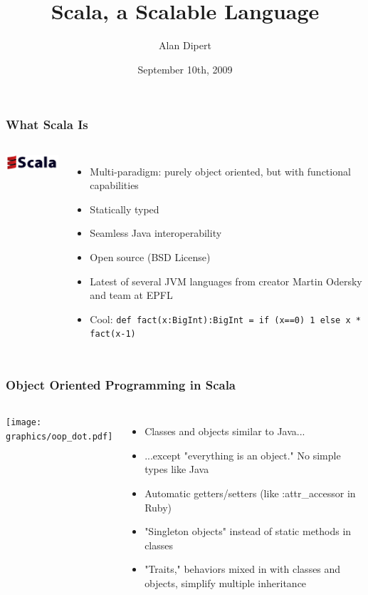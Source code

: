 \documentclass[hyperref={colorlinks=true}]{beamer}
\title{Scala, a Scalable Language}
\author{Alan Dipert}
\date{September 10th, 2009}
\begin{document}
 
\maketitle 

\begin{frame} 
\frametitle{What Scala Is}
\begin{columns}[c]
  \column{0.5in}
    \includegraphics[width=1.0in]{graphics/scala_logo.png} 
  \column{2.5in}
    \begin{itemize}
      \item<1-> Multi-paradigm: purely object oriented, but with functional capabilities
      \item<2-> Statically typed
      \item<3-> Seamless Java interoperability
      \item<4-> Open source (BSD License)
      \item<5-> Latest of several JVM languages from creator Martin Odersky and team at EPFL
      \item<6-> Cool: \tt\small{def fact(x:BigInt):BigInt = if (x==0) 1 else x * fact(x-1)}
    \end{itemize}
\end{columns}
\end{frame} 

\begin{frame} 
\frametitle{Object Oriented Programming in Scala}
\begin{columns}[c]
  \column{1.0in}
    \texttt{[image: graphics/oop\_dot.pdf]} 
  \column{2.0in}
    \begin{itemize}
      \item<1-> Classes and objects similar to Java...
      \item<2-> ...except "everything is an object."  No simple types like Java
      \item<3-> Automatic getters/setters (like :attr\_accessor in Ruby)
      \item<4-> "Singleton objects" instead of static methods in classes
      \item<5-> "Traits," behaviors mixed in with classes and objects, simplify multiple inheritance
    \end{itemize}
\end{columns}
\end{frame} 
\end{document}

